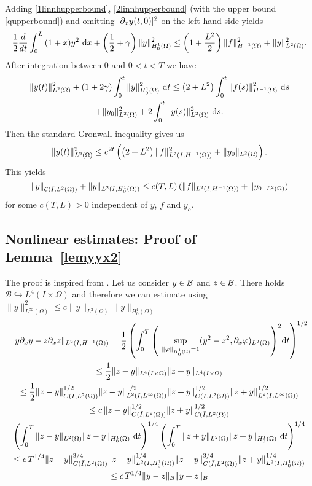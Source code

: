   Adding \eqref{1linnhupperbound}, \eqref{2linnhupperbound} (with the upper bound \eqref{qupperbound}) and omitting $\lvert\partial_{x} y(t,0)\rvert^{2}$ on the left-hand side yields
  \[
  \frac{1}{2}\frac{d}{dt}\int_{0}^{L}{(1+x)y^{2}~\mathrm dx} +\left(\frac{1}{2}+\gamma\right)\|y\|_{H^1_0(\Omega)}^2\leq \left(1 +\frac{L^{2}}{2}\right)\lVert f\rVert_{H^{-1}(\Omega)}^{2} + \|y\|_{L^2(\Omega)}^2.
  \]
  After integration between $0$ and $0<t<T$ we have
  \begin{multline}\label{primitive}
  \|y(t)\|_{L^2(\Omega)}^2+ \left( 1+2\gamma \right)\int_{0}^{t}{\|y\|_{H^1_0(\Omega)}^2~\mathrm dt}\leq \left(2+L^{2}\right)\int_{0}^{t}{\norm{f(s)}_{H^{-1}(\Omega)}^{2}~\mathrm ds}\\
  +\|y_{0}\|_{L^2(\Omega)}^2+2\int_0^t{\|y(s)\|_{L^2(\Omega)}^2~\mathrm ds}.
  \end{multline}
  Then the standard Gronwall inequality gives us
  \[
  \|y(t)\|_{L^2(\Omega)}^2  \leq e^{2t}\left(\left(2+L^{2}\right)\lVert f\rVert_{L^{2}(I,H^{-1}(\Omega))}^{2}+\lVert y_{0}\rVert_{L^{2}(\Omega)}\right).
  \]
  This yields
  \[
  \|y\|_{\mathcal C(\bar I,L^2(\Omega))}+\|y\|_{L^2(I,H^1_0(\Omega))}\leq c(T,L)\,(\|f\|_{\Hm1}+\|y_0\|_{L^2(\Omega)})
  \]
  for some $c(T,L)>0$ independent of $y$, $f$ and $y_o$.
\subsection{Nonlinear estimates: Proof of Lemma~\ref{lemyyx2}}
\label{sec:nonl-state-equat}
The proof is inspired from \cite[Theorem 2.8]{faminskii2010initial}. Let us consider $y \in \mathcal{B}$ and $z \in \mathcal{B}$. There holds $\mathcal B\hookrightarrow L^4(I\times \Omega)$ and therefore we can estimate using $\|y\|_{L^\infty(\Omega)}^2\leq c\|y\|_{L^2(\Omega)}\|y\|_{H^1_0(\Omega)}$
\begin{multline*}
\norm{y\partial_x y - z\partial_x z}_{\Hm1}= \frac 1 2\left(\int_0^T{\left(\ \sup_{\norm{\varphi}_{H^1_0(\Omega)} = 1}(y^2 -  z^2,\partial_x\varphi)_{L^2(\Omega)}\right)^2}\mathrm dt\right)^{1/2} \\
\leq \frac{1}{2}\norm{z-y}_{L^4(I\times \Omega)}\norm{z+y}_{L^4(I\times \Omega)}\\
\leq\frac{1}{2} \norm{z-y}_{C(\bar I,L^2(\Omega))}^{1/2}\norm{z-y}_{L^2(I,L^{\infty}(\Omega))}^{1/2}\norm{z+y}_{C(\bar I,L^2(\Omega))}^{1/2}\norm{z+y}_{L^2(I,L^{\infty}(\Omega))}^{1/2}\\
\leq c\, \norm{z-y}_{C(\bar I,L^2(\Omega))}^{1/2}\norm{z+y}_{C(\bar I,L^2(\Omega))}^{1/2}\\
\left(\int_0^T{ \norm{z-y}_{L^2(\Omega)}\norm{z-y}_{H^1_0(\Omega)}~\mathrm dt}\right)^{1/4}\left(\int_0^T{ \norm{z+y}_{L^2(\Omega)}\norm{z+y}_{H^1_0(\Omega)}~\mathrm dt}\right)^{1/4}\\
\leq c \,T^{1/4}\norm{z-y}_{C(\bar I,L^2(\Omega))}^{3/4}\norm{z-y}_{L^2(I,H^1_0(\Omega))}^{1/4}\norm{z+y}_{C(\bar I,L^2(\Omega))}^{3/4}\norm{z+y}_{L^2(I,H^1_0(\Omega))}^{1/4} \\
\leq c \,T^{1/4}\norm{y-z}_{\B}\norm{y+z}_{\B}
\end{multline*}
